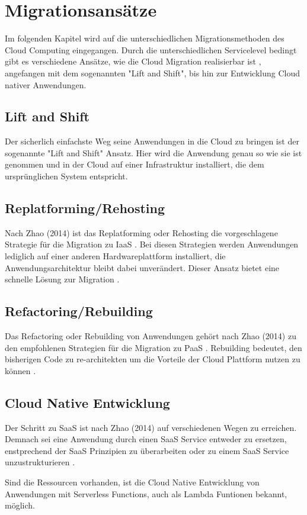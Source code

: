 \section{Migrationsansätze}

Im folgenden Kapitel wird auf die unterschiedlichen Migrationsmethoden des Cloud Computing eingegangen.
Durch die unterschiedlichen Servicelevel bedingt gibt es verschiedene Ansätze, wie die Cloud Migration realisierbar ist \cite[Vgl.][S. 226]{Surianarayanan2019},
angefangen mit dem sogenannten "Lift and Shift", bis hin zur Entwicklung Cloud nativer Anwendungen.

\subsection{Lift and Shift}
Der sicherlich einfachste Weg seine Anwendungen in die Cloud zu bringen ist der sogenannte "Lift and Shift" Ansatz.
Hier wird die Anwendung genau so wie sie ist genommen und in der Cloud auf einer Infrastruktur installiert, die
dem ursprünglichen System entspricht.

\subsection{Replatforming/Rehosting}
Nach Zhao (2014) ist das Replatforming oder Rehosting die vorgeschlagene Strategie für die Migration zu IaaS \cite[Vgl.][S. 144]{Zhao2014}.
Bei diesen Strategien werden Anwendungen lediglich auf einer anderen Hardwareplattform installiert, die Anwendungsarchitektur bleibt dabei
unverändert. Dieser Ansatz bietet eine schnelle Lösung zur Migration \cite[Vgl.][]{CIO}.

\subsection{Refactoring/Rebuilding}
Das Refactoring oder Rebuilding von Anwendungen gehört nach Zhao (2014) zu den empfohlenen Strategien für die Migration zu PaaS \cite[Vgl.][S. 144]{Zhao2014}.
Rebuilding bedeutet, den bisherigen Code zu re-architekten um die Vorteile der Cloud Plattform nutzen zu können \cite[Vgl.][]{CIO}.

\subsection{Cloud Native Entwicklung}
Der Schritt zu SaaS ist nach Zhao (2014) auf verschiedenen Wegen zu erreichen. Demnach sei eine Anwendung durch einen SaaS Service entweder zu ersetzen,
enstprechend der SaaS Prinzipien zu überarbeiten oder zu einem SaaS Service unzustrukturieren \cite[Vgl.][S. 144]{Zhao2014}.

Sind die Ressourcen vorhanden, ist die Cloud Native Entwicklung von Anwendungen mit Serverless Functions, auch als
Lambda Funtionen bekannt, möglich.